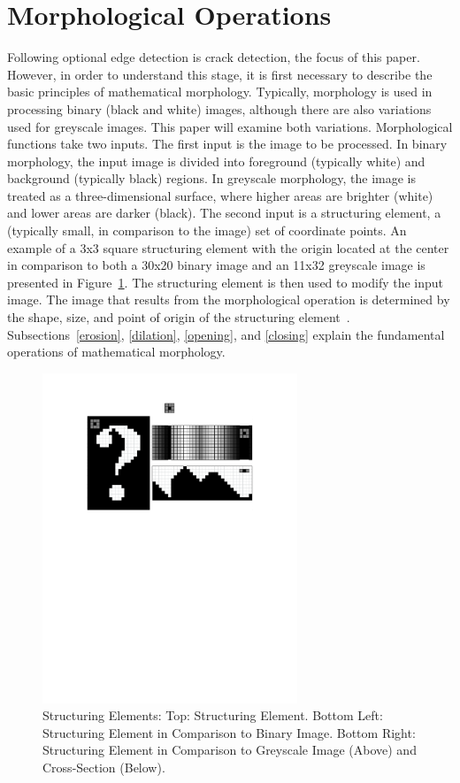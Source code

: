 \documentclass{sig-alternate}
\begin{document}
\section{Morphological Operations}\label{morphological operations}
Following optional edge detection is crack detection, the focus of this paper. However, in order to understand this stage, it is first necessary to describe the basic principles of mathematical morphology. Typically, morphology is used in processing binary (black and white) images, although there are also variations used for greyscale images. This paper will examine both variations. Morphological functions take two inputs. The first input is the image to be processed. In binary morphology, the input image is divided into foreground (typically white) and background (typically black) regions. In greyscale morphology, the image is treated as a three-dimensional surface, where higher areas are brighter (white) and lower areas are darker (black). The second input is a structuring element, a (typically small, in comparison to the image) set of coordinate points. An example of a 3x3 square structuring element with the origin located at the center in comparison to both a 30x20 binary image and an 11x32 greyscale image is presented in Figure~\ref{structuring element figure}. The structuring element is then used to modify the input image. The image that results from the morphological operation is determined by the shape, size, and point of origin of the structuring element~\cite{MorphologyWikiAnonymous, MorphologyBook:2000, MorphologyPaper:1987, MorphologyWiki}. Subsections~\ref{erosion}, \ref{dilation}, \ref{opening}, and \ref{closing} explain the fundamental operations of mathematical morphology.
\begin{figure}
\centering
\includegraphics[width=3in,trim={0 6.5in 0 0},clip]{structuring_element}
\caption{Structuring Elements: Top: Structuring Element. Bottom Left: Structuring Element in Comparison to Binary Image. Bottom Right: Structuring Element in Comparison to Greyscale Image (Above) and Cross-Section (Below).}
\label{structuring element figure}
\end{figure}
\end{document}
